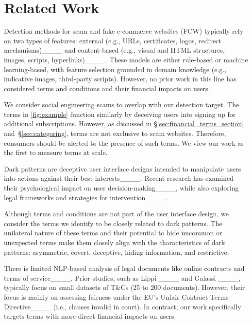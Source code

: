 \section{Related Work}
Detection methods for scam and fake e-commerce websites (FCW) typically rely on two types of features: external (e.g., URLs, certificates, logos, redirect mechanisms)____ and content-based (e.g., visual and HTML structures, images, scripts, hyperlinks)____. These models are either rule-based or machine learning-based, with feature selection grounded in domain knowledge (e.g., indicative images, third-party scripts). However, no prior work in this line has considered terms and conditions and their financial impacts on users.


We consider social engineering scams to overlap with our detection target. The \termname terms in \autoref{fig:example} function similarly by deceiving users into signing up for additional subscriptions. However, as discussed in \S\ref{sec:financial_terms_section} and~\S\ref{sec:categoring}, \termname terms are not exclusive to scam websites. Therefore, consumers should be alerted to the presence of such terms. We view our work as the first to measure \termname terms at scale.



Dark patterns are deceptive user interface designs intended to manipulate users into actions against their best interests____. Recent research has examined their psychological impact on user decision-making____, while also exploring legal frameworks and strategies for intervention____.

Although terms and conditions are not part of the user interface design, we consider the \termname terms we identify to be closely related to dark patterns. The unilateral nature of these terms and their potential to hide uncommon or unexpected terms make them closely align with the characteristics of dark patterns: asymmetric, covert, deceptive, hiding information, and restrictive.



There is limited NLP-based analysis of legal documents like online contracts and terms of service____. Prior studies, such as Lippi \etal____ and Galassi \etal____, typically focus on small datasets of T\&Cs (25 to 200 documents). However, their focus is mainly on assessing fairness under the EU’s Unfair Contract Terms Directive____ (i.e., clauses invalid in court). In contrast, our work specifically targets terms with more direct financial impacts on users.


